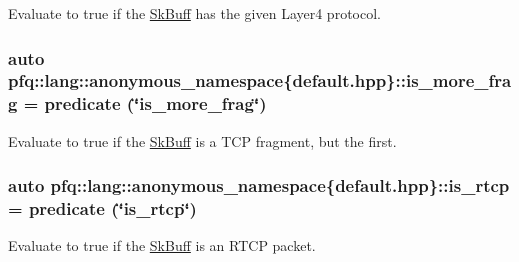 Evaluate to {\ttfamily true} if the \hyperlink{structpfq_1_1lang_1_1SkBuff}{Sk\+Buff} has the given Layer4 protocol. 

\subsubsection[{\texorpdfstring{is\+\_\+more\+\_\+frag}{is_more_frag}}]{\setlength{\rightskip}{0pt plus 5cm}auto pfq\+::lang\+::anonymous\+\_\+namespace\{default.\+hpp\}\+::is\+\_\+more\+\_\+frag = {\bf predicate} (\char`\"{}is\+\_\+more\+\_\+frag\char`\"{})}\hypertarget{namespacepfq_1_1lang_1_1anonymous__namespace_02default_8hpp_03_a0b169afb2f21c8626f06f77ca75feded}{}\label{namespacepfq_1_1lang_1_1anonymous__namespace_02default_8hpp_03_a0b169afb2f21c8626f06f77ca75feded}


Evaluate to {\ttfamily true} if the \hyperlink{structpfq_1_1lang_1_1SkBuff}{Sk\+Buff} is a T\+CP fragment, but the first. 

\subsubsection[{\texorpdfstring{is\+\_\+rtcp}{is_rtcp}}]{\setlength{\rightskip}{0pt plus 5cm}auto pfq\+::lang\+::anonymous\+\_\+namespace\{default.\+hpp\}\+::is\+\_\+rtcp = {\bf predicate} (\char`\"{}is\+\_\+rtcp\char`\"{})}\hypertarget{namespacepfq_1_1lang_1_1anonymous__namespace_02default_8hpp_03_a2cbe73f955007e35d4a627c2cfb38566}{}\label{namespacepfq_1_1lang_1_1anonymous__namespace_02default_8hpp_03_a2cbe73f955007e35d4a627c2cfb38566}


Evaluate to {\ttfamily true} if the \hyperlink{structpfq_1_1lang_1_1SkBuff}{Sk\+Buff} is an R\+T\+CP packet. 

